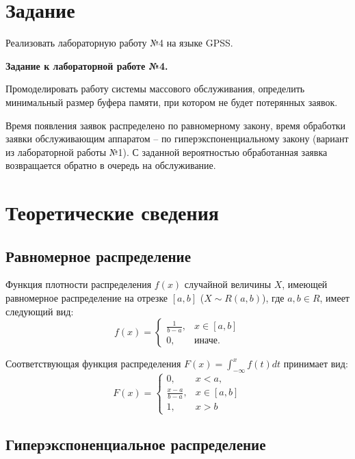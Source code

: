 \documentclass[14pt, a4paper]{extarticle}
\begin{document}


\setcounter{page}{2}

\section{Задание}

Реализовать лабораторную работу №4 на языке GPSS.

\textbf{Задание к лабораторной работе №4.}

Промоделировать работу системы массового обслуживания, определить минимальный размер буфера памяти, при котором не будет потерянных заявок. 

Время появления заявок распределено по равномерному закону, время обработки заявки обслуживающим аппаратом -- по гиперэкспоненциальному закону (вариант из лабораторной работы №1). С заданной вероятностью обработанная заявка возвращается обратно в очередь на обслуживание.

\section{Теоретические сведения}

\subsection{Равномерное распределение}

Функция плотности распределения $f(x)$ случайной величины $X$, имеющей равномерное распределение на отрезке $[a, b]$ ($X \sim R(a, b)$), где $a, b \in R$, имеет следующий вид:
\begin{equation}
	f(x)=\begin{cases}
		\frac{1}{b - a}, & x \in [a, b] \\
		0, & \text{иначе}.
	\end{cases}
\end{equation}

Соответствующая функция распределения $F(x) = \int_{-\infty}^{x}f(t)dt$ принимает вид: 
\begin{equation}
	F(x)=\begin{cases}
		0, & x < a, \\
		\frac{x - a}{b - a}, & x \in [a, b] \\
		1, & x > b
	\end{cases}
\end{equation}


\subsection{Гиперэкспоненциальное распределение}
\end{document}
